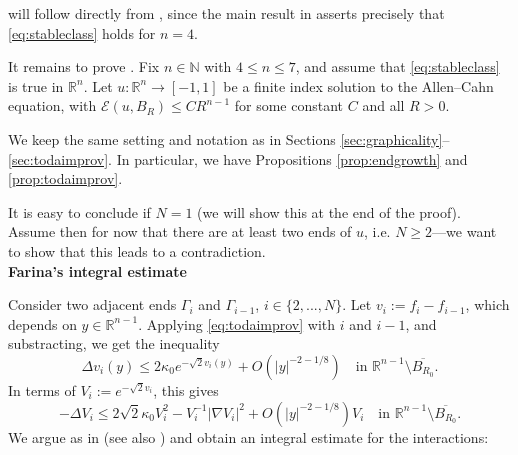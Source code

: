\documentclass{article}
\newcommand{\N}{\mathbb{N}}
\newcommand{\R}{\mathbb{R}}
\theoremstyle{definition}
\begin{document}
 will follow directly from , since the main result in \cite{FSstable} asserts precisely that \eqref{eq:stableclass} holds for $n=4$.

It remains to prove . Fix $n\in\N$ with $4\leq n \leq 7$, and assume that \eqref{eq:stableclass} is true in $\R^n$. Let $u:\R^n\to[-1,1]$ be a finite index solution to the Allen--Cahn equation, with $\mathcal E(u,B_R)\leq CR^{n-1}$ for some constant $C$ and all $R>0$.

We keep the same setting and notation as in Sections \ref{sec:graphicality}--\ref{sec:todaimprov}. In particular, we have Propositions \ref{prop:endgrowth} and \ref{prop:todaimprov}.

It is easy to conclude if $N=1$ (we will show this at the end of the proof). Assume then for now that there are at least two ends of $u$, i.e. $N\geq 2$---we want to show that this leads to a contradiction.\\
{\bf Farina's integral estimate}

Consider two adjacent ends $\Gamma_i$ and $\Gamma_{i-1}$, $i\in\{2,...,N\}$. Let $v_i := f_i - f_{i-1}$, which depends on $y\in\R^{n-1}$. Applying \eqref{eq:todaimprov} with $i$ and $i-1$, and substracting, we get the inequality
\begin{equation*}
\Delta v_i (y)\leq 2\kappa_0 e^{-\sqrt{2} v_i(y)} + O(|y|^{-2 - 1/8}) \quad \text{in } \R^{n-1}\setminus \overline{B_{R_0}}.
\end{equation*}
In terms of $V_i:= e^{-\sqrt{2}v_i}$, this gives
\begin{equation*}
- \Delta V_i \leq 2\sqrt{2}\kappa_0 V_i^2- V_i^{-1} |\nabla V_i|^2 + O(|y|^{-2 - 1/8}) V_i \quad \text{in } \R^{n-1}\setminus \overline{B_{R_0}}.
\end{equation*}
We argue as in \cite{Far07} (see also \cite{DF09,Wang19,GuiWangWei2020}) and obtain an integral estimate for the interactions:
\end{document}
